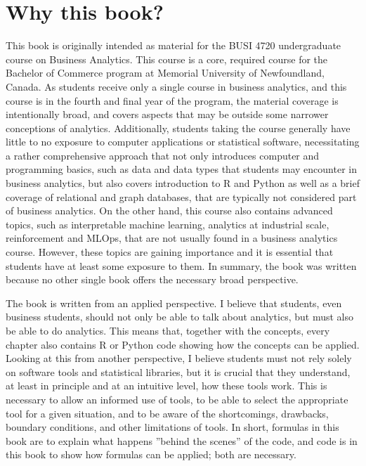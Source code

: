 %
%

\section*{Why this book?}

This book is originally intended as material for the BUSI 4720 undergraduate course on Business Analytics. This course is a core, required course for the Bachelor of Commerce program at Memorial University of Newfoundland, Canada. As students receive only a single course in business analytics, and this course is in the fourth and final year of the program, the material coverage is intentionally broad, and covers aspects that may be outside some narrower conceptions of analytics. Additionally, students taking the course generally have little to no exposure to computer applications or statistical software, necessitating a rather comprehensive approach that not only introduces computer and programming basics, such as data and data types that students may encounter in business analytics, but also covers introduction to R and Python as well as a brief coverage of relational and graph databases, that are typically not considered part of business analytics. On the other hand, this course also contains advanced topics, such as interpretable machine learning, analytics at industrial scale, reinforcement and MLOps, that are not usually found in a business analytics course. However, these topics are gaining importance and it is essential that students have at least some exposure to them. In summary, the book was written because no other single book offers the necessary broad perspective. 

The book is written from an applied perspective. I believe that students, even business students, should not only be able to talk about analytics, but must also be able to do analytics. This means that, together with the concepts, every chapter also contains R or Python code showing how the concepts can be applied. Looking at this from another perspective, I believe students must not rely solely on software tools and statistical libraries, but it is crucial that they understand, at least in principle and at an intuitive level, how these tools work. This is necessary to allow an informed use of tools, to be able to select the appropriate tool for a given situation, and to be aware of the shortcomings, drawbacks, boundary conditions, and other limitations of tools. In short, formulas in this book are to explain what happens ''behind the scenes'' of the code, and code is in this book to show how formulas can be applied; both are necessary.

